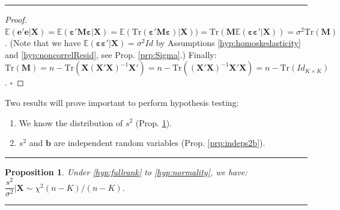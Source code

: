 \documentclass[
]{book}
\providecommand{\tightlist}{%
  \setlength{\itemsep}{0pt}\setlength{\parskip}{0pt}}
\newtheorem{proposition}{Proposition}[chapter]
\theoremstyle{definition}
\theoremstyle{definition}
\theoremstyle{definition}
\theoremstyle{definition}
\theoremstyle{remark}
\begin{document}
\begin{center}\rule{0.5\linewidth}{0.5pt}\end{center}

\begin{proof}
\(\mathbb{E}(\mathbf{e}'\mathbf{e}|\mathbf{X})=\mathbb{E}(\boldsymbol{\varepsilon}'\mathbf{M}\boldsymbol{\varepsilon}|\mathbf{X})=\mathbb{E}(\mbox{Tr}(\boldsymbol{\varepsilon}'\mathbf{M}\boldsymbol{\varepsilon})|\mathbf{X})) =\mbox{Tr}(\mathbf{M}\mathbb{E}(\boldsymbol{\varepsilon}\boldsymbol{\varepsilon}'|\mathbf{X}))=\sigma^2 \mbox{Tr}(\mathbf{M})\). (Note that we have \(\mathbb{E}(\boldsymbol{\varepsilon}\boldsymbol{\varepsilon}'|\mathbf{X})=\sigma^2Id\) by Assumptions \ref{hyp:homoskedasticity} and \ref{hyp:noncorrelResid}, see Prop. \ref{prp:Sigma}.) Finally: \(\mbox{Tr}(\mathbf{M})=n-\mbox{Tr}(\mathbf{X}(\mathbf{X}'\mathbf{X})^{-1}\mathbf{X}')=n-\mbox{Tr}((\mathbf{X}'\mathbf{X})^{-1}\mathbf{X}'\mathbf{X})=n-\mbox{Tr}(Id_{K\times K})\). \(\square\)
\end{proof}

Two results will prove important to perform hypothesis testing:

\begin{enumerate}
\def\labelenumi{\roman{enumi}.}
\tightlist
\item
  We know the distribution of \(s^2\) (Prop. \ref{prp:s2distri}).
\item
  \(s^2\) and \(\mathbf{b}\) are independent random variables (Prop. \ref{prp:indeps2b}).
\end{enumerate}

\begin{center}\rule{0.5\linewidth}{0.5pt}\end{center}

\begin{proposition}
\protect\hypertarget{prp:s2distri}{}\label{prp:s2distri}Under \ref{hyp:fullrank} to \ref{hyp:normality}, we have: \(\dfrac{s^2}{\sigma^2} | \mathbf{X} \sim \chi^2(n-K)/(n-K)\).
\end{proposition}

\begin{center}\rule{0.5\linewidth}{0.5pt}\end{center}
\end{document}
